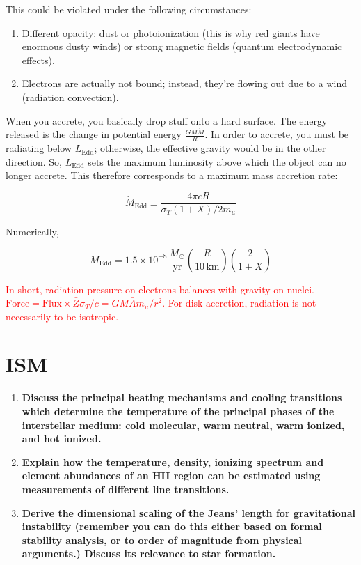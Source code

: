 \documentclass[12pt, letterpaper, preprint]{aastex}
\newcommand{\ledd}{L_{\mathrm{Edd}}}
\newcommand{\medd}{\dot{M}_{\mathrm{Edd}}}
\begin{document}
\begin{enumerate}
This could be violated under the following circumstances:

\begin{enumerate}
\item Different opacity: dust or photoionization (this is why red giants have enormous dusty winds) or strong magnetic fields (quantum electrodynamic effects).
\item Electrons are actually not bound; instead, they're flowing out due to a wind (radiation convection).
\end{enumerate}

When you accrete, you basically drop stuff onto a hard surface. The energy released is the change in potential energy $ \frac{G M \dot{M} }{R} $. In order to accrete, you must be radiating below $\ledd$; otherwise, the effective gravity would be in the other direction. So, $\ledd$ sets the maximum luminosity above which the object can no longer accrete. This therefore corresponds to a maximum mass accretion rate:

\begin{equation}
\medd \equiv \frac{4 \pi c R}{\sigma_T (1 + X) / 2 m_u}
\end{equation}

Numerically,

$$ \medd = 1.5 \times 10^{-8} \, \frac{M_\odot}{\mathrm{yr}} \left( \frac{R}{10\,\mathrm{km}} \right) \left( \frac{2}{1+X} \right) $$

\textcolor{red}{In short, radiation pressure on electrons balances with gravity on nuclei. $\mathrm{Force}=\mathrm{Flux} \times \bar{Z}\sigma_{T}/c=GM \bar{A}m_u/r^2$. For disk accretion, radiation is not necessarily to be isotropic. }

\end{enumerate}

\section*{ISM}

\begin{enumerate}

\item \textbf{Discuss the principal heating mechanisms and cooling
transitions which determine the temperature of the principal phases
of the interstellar medium: cold molecular, warm neutral, warm
ionized, and hot ionized.}

\item \textbf{Explain how the temperature, density, ionizing spectrum
and element abundances of an HII region can be estimated using
measurements of different line transitions.}

\item \textbf{Derive the dimensional scaling of the Jeans' length for
gravitational instability (remember you can do this either based on
formal stability analysis, or to order of magnitude from physical arguments.) Discuss its relevance to star formation.}

\end{enumerate}
\end{document}

